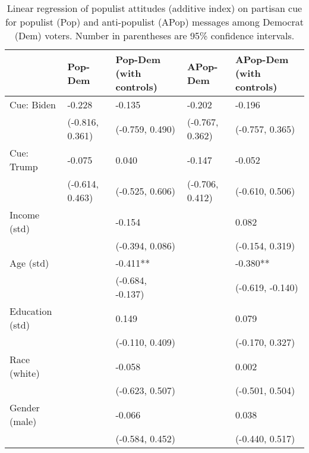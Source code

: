 \begin{table}[th!]
\centering
\caption{Linear regression of populist attitudes (additive index) on partisan cue for populist (Pop) and anti-populist (APop) messages among Democrat (Dem) voters. Number in parentheses are 95\% confidence intervals.}
\label{tab-reg-dem-popadd.tex}
\begin{threeparttable}
\begin{tabular}{lC{3cm}C{3cm}C{3cm}C{3cm}}
\toprule
                &         Pop-Dem & Pop-Dem (with controls) &        APop-Dem & APop-Dem (with controls) \\
\midrule
     Cue: Biden &          -0.228 &                  -0.135 &          -0.202 &                   -0.196 \\
                & (-0.816, 0.361) &         (-0.759, 0.490) & (-0.767, 0.362) &          (-0.757, 0.365) \\
     Cue: Trump &          -0.075 &                   0.040 &          -0.147 &                   -0.052 \\
                & (-0.614, 0.463) &         (-0.525, 0.606) & (-0.706, 0.412) &          (-0.610, 0.506) \\
   Income (std) &                 &                  -0.154 &                 &                    0.082 \\
                &                 &         (-0.394, 0.086) &                 &          (-0.154, 0.319) \\
      Age (std) &                 &                -0.411** &                 &                 -0.380** \\
                &                 &        (-0.684, -0.137) &                 &         (-0.619, -0.140) \\
Education (std) &                 &                   0.149 &                 &                    0.079 \\
                &                 &         (-0.110, 0.409) &                 &          (-0.170, 0.327) \\
   Race (white) &                 &                  -0.058 &                 &                    0.002 \\
                &                 &         (-0.623, 0.507) &                 &          (-0.501, 0.504) \\
  Gender (male) &                 &                  -0.066 &                 &                    0.038 \\
                &                 &         (-0.584, 0.452) &                 &          (-0.440, 0.517) \\

\end{tabular}
\end{threeparttable}
\end{table}
